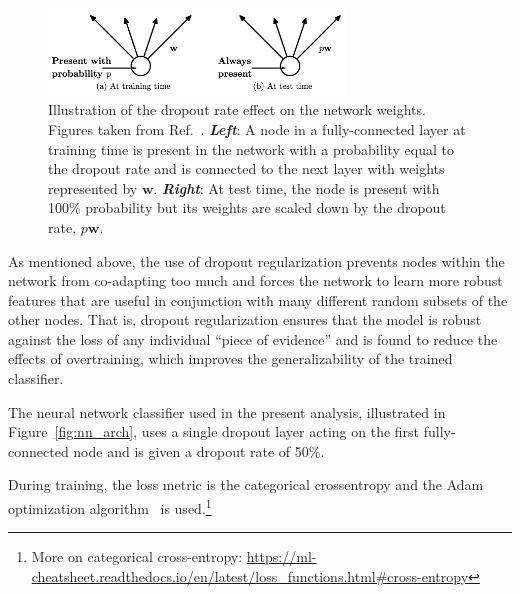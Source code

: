 \begin{figure}[!htb]
    \begin{center}
        \includegraphics[width=0.7\textwidth]{figures/search_hh/mva/dropout_weight_scaling}
        \caption{
            Illustration of the dropout rate effect on the network weights. Figures taken from Ref.~\cite{JMLRDropout}.
            \textit{\textbf{Left}}: A node in a fully-connected layer at training time is present in the network with
                a probability equal to the dropout rate and is connected to the next layer with weights represented by $\bm{w}$.
            \textit{\textbf{Right}}: At test time, the node is present with 100\% probability but its weights are scaled down by the
                dropout rate, $p\bm{w}$.
        }
        \label{fig:dropout_weight_scaling}
    \end{center}
\end{figure}

\noindent
As mentioned above, the use of dropout regularization prevents nodes within the network from co-adapting
too much and forces the network to learn more robust features that are useful in conjunction with many 
different random subsets of the other nodes.
That is, dropout regularization ensures that the model is robust against the loss of any individual
``piece of evidence'' and is found to reduce the effects of overtraining, which improves the generalizability
of the trained classifier.

The neural network classifier used in the present analysis, illustrated in Figure~\ref{fig:nn_arch},
uses a single dropout layer acting on the first fully-connected node and is given a dropout rate of 50\%.

During training, the loss metric is the categorical crossentropy and the Adam optimization algorithm~\cite{AdamOptimizer} is used.\footnote{More
on categorical cross-entropy: \href{https://ml-cheatsheet.readthedocs.io/en/latest/loss_functions.html\#cross-entropy}
{https://ml-cheatsheet.readthedocs.io/en/latest/loss\_functions.html\#cross-entropy}}


%
%
